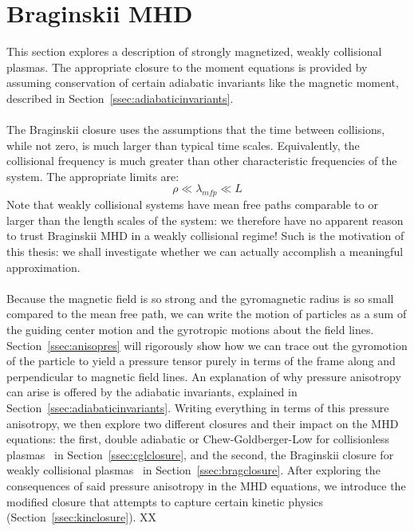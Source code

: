

\section{Braginskii MHD} \label{sec:bragMHD}
This section explores a description of strongly magnetized, weakly collisional plasmas. The appropriate closure to the moment equations is provided by assuming conservation of certain adiabatic invariants like the magnetic moment, described in Section~\ref{ssec:adiabaticinvariants}. \\
\\
The Braginskii closure uses the assumptions that the time between collisions, while not zero, is much larger than typical time scales. Equivalently, the collisional frequency is much greater than other characteristic frequencies of the system. The appropriate limits are:
\begin{equation}
  \rho\ll\lambda_{mfp}\ll L \label{eq:bragord}
\end{equation}
Note that weakly collisional systems have mean free paths comparable to or larger than the length scales of the system: we therefore have no apparent reason to trust Braginskii MHD in a weakly collisional regime! Such is the motivation of this thesis: we shall investigate whether we can actually accomplish a meaningful approximation.\\
\\
Because the magnetic field is so strong and the gyromagnetic radius is so small compared to the mean free path, we can write the motion of particles as a sum of the guiding center motion and the gyrotropic motions about the field lines. Section~\ref{ssec:anisopres} will rigorously show how we can trace out the gyromotion of the particle to yield a pressure tensor purely in terms of the frame along and perpendicular to magnetic field lines. An explanation of why pressure anisotropy can arise is offered by the adiabatic invariants, explained in Section~\ref{ssec:adiabaticinvariants}. Writing everything in terms of this pressure anisotropy, we then explore two different closures and their impact on the MHD equations: the first, double adiabatic or Chew-Goldberger-Low for collisionless plasmas~\cite{CGL1956} in Section~\ref{ssec:cglclosure}, and the second, the Braginskii closure for weakly collisional plasmas~\cite{Braginskii1956} in Section~\ref{ssec:bragclosure}. After exploring the consequences of said pressure anisotropy in the MHD equations, we introduce the modified closure that attempts to capture certain kinetic physics (Section~\ref{ssec:kinclosure}).
XX

